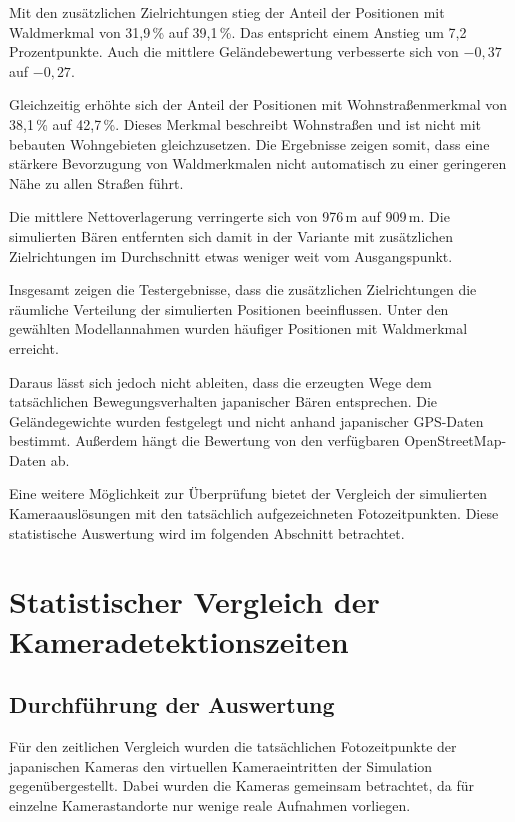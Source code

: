 \documentclass[12pt,a4paper]{report}
\begin{document}
Mit den zusätzlichen Zielrichtungen stieg
der Anteil der Positionen mit Waldmerkmal
von 31,9\,\% auf 39,1\,\%. Das entspricht
einem Anstieg um 7,2 Prozentpunkte.
Auch die mittlere Geländebewertung
verbesserte sich von $-0{,}37$ auf
$-0{,}27$.

Gleichzeitig erhöhte sich der Anteil der
Positionen mit Wohnstraßenmerkmal von
38,1\,\% auf 42,7\,\%. Dieses Merkmal
beschreibt Wohnstraßen und ist nicht
mit bebauten Wohngebieten gleichzusetzen.
Die Ergebnisse zeigen somit, dass eine
stärkere Bevorzugung von Waldmerkmalen
nicht automatisch zu einer geringeren
Nähe zu allen Straßen führt.

Die mittlere Nettoverlagerung verringerte
sich von 976\,m auf 909\,m. Die
simulierten Bären entfernten sich
damit in der Variante mit zusätzlichen
Zielrichtungen im Durchschnitt etwas
weniger weit vom Ausgangspunkt.

Insgesamt zeigen die Testergebnisse,
dass die zusätzlichen Zielrichtungen
die räumliche Verteilung der
simulierten Positionen beeinflussen.
Unter den gewählten Modellannahmen
wurden häufiger Positionen mit
Waldmerkmal erreicht.

Daraus lässt sich jedoch nicht
ableiten, dass die erzeugten Wege
dem tatsächlichen Bewegungsverhalten
japanischer Bären entsprechen.
Die Geländegewichte wurden festgelegt
und nicht anhand japanischer GPS-Daten
bestimmt. Außerdem hängt die Bewertung
von den verfügbaren OpenStreetMap-Daten ab.

Eine weitere Möglichkeit zur Überprüfung
bietet der Vergleich der simulierten
Kameraauslösungen mit den tatsächlich
aufgezeichneten Fotozeitpunkten.
Diese statistische Auswertung wird
im folgenden Abschnitt betrachtet.




\section{Statistischer Vergleich der Kameradetektionszeiten}
\label{sec:ergebnisse-kamerazeiten}

\subsection{Durchführung der Auswertung}

Für den zeitlichen Vergleich wurden die tatsächlichen
Fotozeitpunkte der japanischen Kameras den virtuellen
Kameraeintritten der Simulation gegenübergestellt.
Dabei wurden die Kameras gemeinsam betrachtet,
da für einzelne Kamerastandorte nur wenige reale
Aufnahmen vorliegen.
\end{document}
